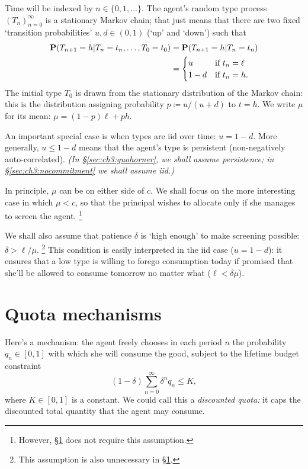 Time will be indexed by $n \in \{0,1,\dots\}$.
The agent's random type process $( T_n )_{n=0}^\infty$ is a stationary Markov chain;
that just means that there are two fixed `transition probabilities' $u,d \in (0,1)$ (`up' and `down') such that
%
\begin{align*}
	\PP\left( T_{n+1} = h \middle|
	T_n = t_n, \dots,
	T_0 = t_0 \right)
	&= \PP\left( T_{n+1} = h \middle|
	T_n = t_n \right)
	\\
	&=
	\begin{cases}
		u		& \text{if $t_n = \ell$} \\
		1-d		& \text{if $t_n = h$.} 
	\end{cases}
\end{align*}
%
The initial type $T_0$ is drawn from the stationary distribution of the Markov chain: this is the distribution assigning probability $p \coloneqq u / (u+d)$ to $t=h$.
We write $\mu$ for its mean: $\mu = (1-p) \ell + p h$.

An important special case is when types are iid over time: $u=1-d$.
More generally, $u \leq 1-d$ means that the agent's type is persistent (non-negatively auto-correlated).
\emph{(In §\ref{sec:ch3:guohorner}, we shall assume persistence; in §\ref{sec:ch3:nocommitment} we shall assume iid.)}

In principle, $\mu$ can be on either side of $c$.
We shall focus on the more interesting case in which $\mu < c$, so that the principal wishes to allocate only if she manages to screen the agent.%
	\footnote{However, §\ref{sec:ch3:token} does not require this assumption.}

We shall also assume that patience $\delta$ is `high enough' to make screening possible: $\delta > \ell/\mu$.%
	\footnote{This assumption is also unnecessary in §\ref{sec:ch3:token}.}
This condition is easily interpreted in the iid case ($u=1-d$):
it ensures that a low type is willing to forego consumption today if promised that she'll be allowed to consume tomorrow no matter what ($\ell < \delta \mu$).



\section{Quota mechanisms}
\label{sec:ch3:token}

Here's a mechanism:
the agent freely chooses in each period $n$
the probability $q_n \in [0,1]$ with which she will consume the good,
subject to the lifetime budget constraint
%
\begin{equation*}
	(1-\delta) \sum_{n=0}^\infty \delta^n q_n 
	\leq K ,
\end{equation*}
%
where $K \in [0,1]$ is a constant.
We could call this a \emph{discounted quota:}
it caps the discounted total quantity that the agent may consume.


